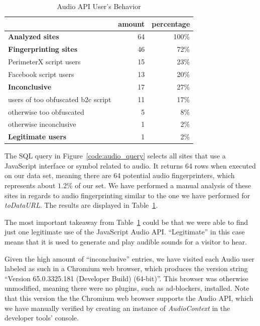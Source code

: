 \documentclass[
    fontsize=12pt,
    headings=small,
    parskip=half,
    bibliography=totoc,
    numbers=noenddot,
    open=any
    ]{scrreprt}
\begin{document}
\begin{table}
\centering
\caption{Audio API User's Behavior}
\begin{tabular}{l r r}
    \toprule
    & amount & percentage \\
    \midrule
    \textbf{Analyzed sites} & 64 & 100\% \\
    \midrule
    \textbf{Fingerprinting sites} & 46 & 72\% \\
    PerimeterX script users & 15 & 23\% \\
    Facebook script users & 13 & 20\% \\
    \midrule
    \textbf{Inconclusive} & 17 & 27\% \\
    users of too obfuscated b2c script & 11 & 17\% \\
    otherwise too obfuscated & 5 & 8\% \\
    otherwise inconclusive & 1 & 2\% \\
    \midrule
    \textbf{Legitimate users} & 1 & 2\% \\
    \bottomrule
\end{tabular}
\label{table:audio_users}
\end{table}

The SQL query in Figure~\ref{code:audio_query} selects all sites that
use a JavaScript interface or symbol related to audio.
It returns 64 rows when executed on our data set, meaning there are 64 potential audio
fingerprinters, which represents about $1.2\%$ of our set.
We have performed a manual analysis of these sites in regards to audio
fingerprinting similar to the one we have performed for \textit{toDataURL}.
The results are displayed in Table~\ref{table:audio_users}.

The most important takeaway from Table~\ref{table:audio_users} could be that we were
able to find just one legitimate use of the JavaScript Audio API.
``Legitimate'' in this case means that it is used to generate and play audible sounds
for a visitor to hear.

Given the high amount of ``inconclusive'' entries, we have visited each Audio user labeled as such
in a Chromium web browser, which produces the version string ``Version 65.0.3325.181 (Developer Build) (64-bit)''.
This browser was otherwise unmodified, meaning there were no plugins, such as ad-blockers, installed.
Note that this version the the Chromium web browser supports the Audio API, which we have manually verified
by creating an instance of \textit{AudioContext} in the developer tools' console.
\end{document}
